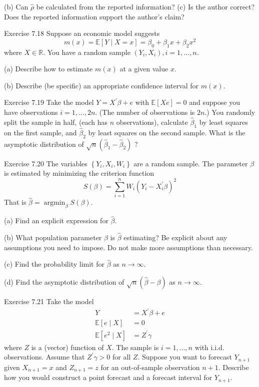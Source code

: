 \documentclass[10pt]{article}
\begin{document}
(b) Can $\widehat{\rho}$ be calculated from the reported information? (c) Is the author correct? Does the reported information support the author's claim?

Exercise 7.18 Suppose an economic model suggests
$$
m(x)=\mathbb{E}[Y \mid X=x]=\beta_{0}+\beta_{1} x+\beta_{2} x^{2}
$$
where $X \in \mathbb{R}$. You have a random sample $\left(Y_{i}, X_{i}\right), i=1, \ldots, n$.

(a) Describe how to estimate $m(x)$ at a given value $x$.

(b) Describe (be specific) an appropriate confidence interval for $m(x)$.

Exercise 7.19 Take the model $Y=X^{\prime} \beta+e$ with $\mathbb{E}[X e]=0$ and suppose you have observations $i=1, \ldots, 2 n$. (The number of observations is $2 n$.) You randomly split the sample in half, (each has $n$ observations), calculate $\widehat{\beta}_{1}$ by least squares on the first sample, and $\widehat{\beta}_{2}$ by least squares on the second sample. What is the asymptotic distribution of $\sqrt{n}\left(\widehat{\beta}_{1}-\widehat{\beta}_{2}\right)$ ?

Exercise 7.20 The variables $\left\{Y_{i}, X_{i}, W_{i}\right\}$ are a random sample. The parameter $\beta$ is estimated by minimizing the criterion function
$$
S(\beta)=\sum_{i=1}^{n} W_{i}\left(Y_{i}-X_{i}^{\prime} \beta\right)^{2}
$$
That is $\widehat{\beta}=\operatorname{argmin}_{\beta} S(\beta)$.

(a) Find an explicit expression for $\widehat{\beta}$.

(b) What population parameter $\beta$ is $\widehat{\beta}$ estimating? Be explicit about any assumptions you need to impose. Do not make more assumptions than necessary.

(c) Find the probability limit for $\widehat{\beta}$ as $n \rightarrow \infty$.

(d) Find the asymptotic distribution of $\sqrt{n}(\widehat{\beta}-\beta)$ as $n \rightarrow \infty$.

Exercise 7.21 Take the model
$$
\begin{aligned}
Y &=X^{\prime} \beta+e \\
\mathbb{E}[e \mid X] &=0 \\
\mathbb{E}\left[e^{2} \mid X\right] &=Z^{\prime} \gamma
\end{aligned}
$$
where $Z$ is a (vector) function of $X$. The sample is $i=1, \ldots, n$ with i.i.d. observations. Assume that $Z^{\prime} \gamma>0$ for all $Z$. Suppose you want to forecast $Y_{n+1}$ given $X_{n+1}=x$ and $Z_{n+1}=z$ for an out-of-sample observation $n+1$. Describe how you would construct a point forecast and a forecast interval for $Y_{n+1}$.
\end{document}
